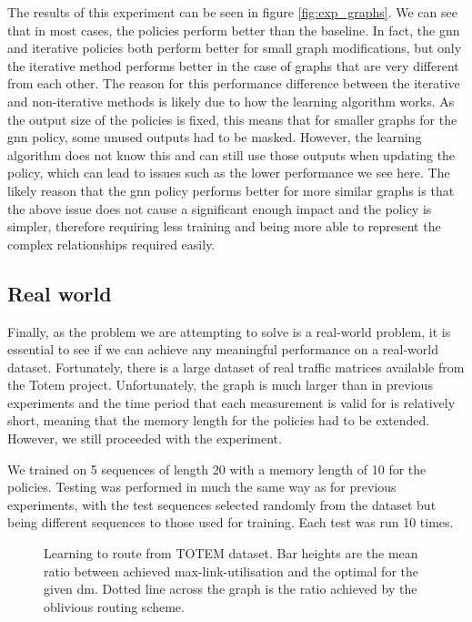 The results of this experiment can be seen in figure \ref{fig:exp_graphs}. We can see that in most cases, the policies perform better than the baseline. In fact, the \ac{gnn} and iterative policies both perform better for small graph modifications, but only the iterative method performs better in the case of graphs that are very different from each other. The reason for this performance difference between the iterative and non-iterative methods is likely due to how the learning algorithm works. As the output size of the policies is fixed, this means that for smaller graphs for the \ac{gnn} policy, some unused outputs had to be masked. However, the learning algorithm does not know this and can still use those outputs when updating the policy, which can lead to issues such as the lower performance we see here. The likely reason that the \ac{gnn} policy performs better for more similar graphs is that the above issue does not cause a significant enough impact and the policy is simpler, therefore requiring less training and being more able to represent the complex relationships required easily.

\subsection{Real world}
Finally, as the problem we are attempting to solve is a real-world problem, it is essential to see if we can achieve any meaningful performance on a real-world dataset. Fortunately, there is a large dataset of real traffic matrices available from the Totem\cite{uhlig2006providing} project. Unfortunately, the graph is much larger than in previous experiments and the time period that each measurement is valid for is relatively short, meaning that the memory length for the policies had to be extended. However, we still proceeded with the experiment.

We trained on 5 sequences of length 20 with a memory length of 10 for the policies. Testing was performed in much the same way as for previous experiments, with the test sequences selected randomly from the dataset but being different sequences to those used for training. Each test was run 10 times.

\begin{figure}
    \centering
    \resizebox{\textwidth}{!}{}
    \caption{Learning to route from TOTEM dataset. Bar heights are the mean ratio between achieved max-link-utilisation and the optimal for the given \ac{dm}. Dotted line across the graph is the ratio achieved by the oblivious routing scheme.}
    \label{fig:exp_real}
\end{figure}

